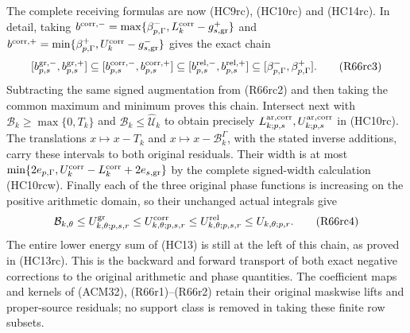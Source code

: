 The complete receiving formulas are now (HC9rc), (HC10rc) and
(HC14rc). In detail, taking
$b^{\rm corr,-}=\max\{\beta_{p,\Gamma}^-,L_k^{\rm corr}-g_{s,\rm gr}^+\}$
and
$b^{\rm corr,+}=\min\{\beta_{p,\Gamma}^+,U_k^{\rm corr}-g_{s,\rm gr}^-\}$
gives the exact chain
\[
 [b_{p,s}^{\rm gr,-},b_{p,s}^{\rm gr,+}]
 \subseteq[b_{p,s}^{\rm corr,-},b_{p,s}^{\rm corr,+}]
 \subseteq[b_{p,s}^{\rm rel,-},b_{p,s}^{\rm rel,+}]
 \subseteq[\beta_{p,\Gamma}^-,\beta_{p,\Gamma}^+].
 \tag{R66rc3}
\]
Subtracting the same signed augmentation from (R66rc2) and
then taking the common maximum and minimum proves this chain.
Intersect next with $\mathcal B_k\geq\max\{0,T_k\}$ and
$\mathcal B_k\leq\widehat{\mathcal U}_k$ to obtain precisely
$L_{k;p,s}^{\rm ar,corr},U_{k;p,s}^{\rm ar,corr}$ in (HC10rc).
The translations $x\mapsto x-T_k$ and
$x\mapsto x-\mathcal B_k^\Gamma$, with the stated inverse
additions, carry these intervals to both original residuals.
Their width is at most
$\min\{2e_{p,\Gamma},U_k^{\rm corr}-L_k^{\rm corr}+2e_{s,\rm gr}\}$
by the complete signed-width calculation (HC10rcw).
Finally each of the three original phase functions is increasing
on the positive arithmetic domain, so their unchanged actual
integrals give
\[
 \mathcal B_{k,\theta}
 \leq U_{k,\theta;p,s,r}^{\rm gr}
 \leq U_{k,\theta;p,s,r}^{\rm corr}
 \leq U_{k,\theta;p,s,r}^{\rm rel}\leq U_{k,\theta;p,r}.
 \tag{R66rc4}
\]
The entire lower energy sum of (HC13) is still at the left of
this chain, as proved in (HC13rc). This is the backward and
forward transport of both exact negative corrections to the
original arithmetic and phase quantities. The coefficient maps
and kernels of (ACM32), (R66r1)--(R66r2) retain their original
maskwise lifts and proper-source residuals; no support class is
removed in taking these finite row subsets.

